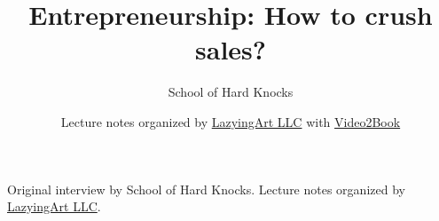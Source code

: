 \documentclass[11pt,oneside]{book}
\begin{document}
\frontmatter
\title{Entrepreneurship: How to crush sales?}
\author{School of Hard Knocks}
\date{Lecture notes organized by \href{https://lazying.art}{LazyingArt LLC} with \href{https://github.com/lachlanchen/Video2Book}{Video2Book}}
\maketitle
\begin{center}
\small Original interview by School of Hard Knocks. Lecture notes organized by \href{https://lazying.art}{LazyingArt LLC}.
\end{center}
\clearpage
\mainmatter

\end{document}
